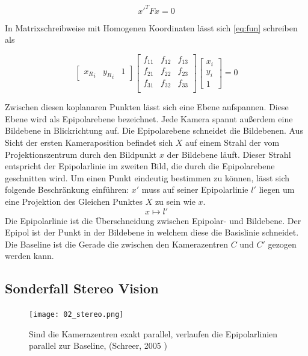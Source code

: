 \begin{equation}
  {x'}^{T}Fx = 0
  \label{eq:fun}
\end{equation}

%
In Matrixschreibweise mit Homogenen Koordinaten lässt sich \ref{eq:fun} schreiben als

\begin{equation}
  \begin{bmatrix}
    {x_R}_i & {y_R}_i & 1
  \end{bmatrix}
  \begin{bmatrix}
    f_{11} & f_{12} & f_{13} \\
    f_{21} & f_{22} & f_{23} \\
    f_{31} & f_{32} & f_{33} \\
  \end{bmatrix}
  \begin{bmatrix}
    x_i \\
    y_i \\
    1
  \end{bmatrix}
  = 0
\end{equation}

Zwischen diesen koplanaren Punkten lässt sich eine Ebene aufspannen. Diese Ebene wird als Epipolarebene bezeichnet. Jede Kamera spannt au{\ss}erdem eine Bildebene in Blickrichtung auf. Die Epipolarebene schneidet die Bildebenen. Aus Sicht der ersten Kameraposition befindet sich $X$ auf einem Strahl der vom Projektionszentrum durch den Bildpunkt $x$ der Bildebene läuft. Dieser Strahl entspricht der Epipolarlinie im zweiten Bild, die durch die Epipolarebene geschnitten wird.
%
Um einen Punkt eindeutig bestimmen zu können, lässt sich folgende Beschränkung einführen: $x'$ muss auf seiner Epipolarlinie $l'$ liegen um eine Projektion des Gleichen Punktes $X$ zu sein wie $x$.
\begin{equation}
  x \mapsto l' 
\end{equation}
Die Epipolarlinie ist die Überschneidung zwischen Epipolar- und Bildebene. Der Epipol ist der Punkt in der Bildebene in welchem diese die Basislinie schneidet. Die Baseline ist die Gerade die zwischen den Kamerazentren $C$ und $C'$ gezogen werden kann. 

\subsection{Sonderfall Stereo Vision}
\begin{center}
    \begin{figure}[h!]
    	\centering
    	\texttt{[image: 02\_stereo.png]}
    	\caption[Parallele Epipolarlinien]{Sind die Kamerazentren exakt parallel, verlaufen die Epipolarlinien parallel zur Baseline, (Schreer, 2005 \cite{stereoSchreer})}
    	\label{fig:stereoepi}
    \end{figure}
\end{center}

